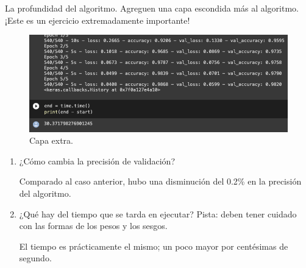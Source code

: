 
\begin{problema}
	La profundidad del algoritmo.  Agreguen una capa escondida más al algoritmo. ¡Este es un ejercicio extremadamente importante! 
	\begin{figure}[H]
		\centering
		\includegraphics[scale=0.5]{Images/3.png}
		\caption{Capa extra.}
	\end{figure}
	\begin{enumerate}
		\item  ¿Cómo cambia la precisión de validación?  
		\begin{sol}
			Comparado al caso anterior, hubo una disminución del 0.2\% en la precisión del algoritmo.  
		\end{sol}
		\item ¿Qué hay del tiempo que se tarda en ejecutar?   Pista:  deben tener cuidado con las formas de los pesos y los sesgos.
		\begin{sol}
			El tiempo es prácticamente el mismo; un poco mayor por centésimas de segundo. 
		\end{sol}
	\end{enumerate}
\end{problema}
